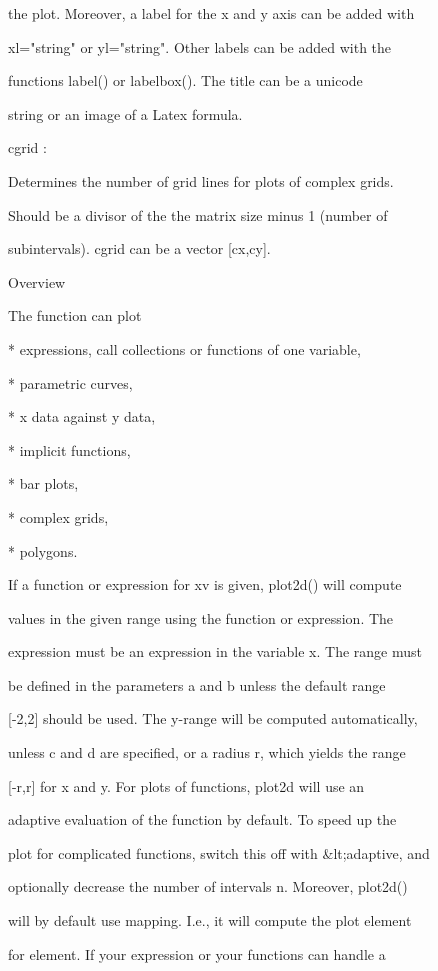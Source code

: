 \documentclass{article}
\begin{document}
  the plot. Moreover, a label for the x and y axis can be added with


  xl="string" or yl="string". Other labels can be added with the


  functions label() or labelbox(). The title can be a unicode


  string or an image of a Latex formula.


cgrid     :


  Determines the number of grid lines for plots of complex grids.


  Should be a divisor of the the matrix size minus 1 (number of


  subintervals). cgrid can be a vector [cx,cy].


Overview


The function can plot


* 
expressions, call collections or functions of one variable,

* 
parametric curves,

* 
x data against y data,

* 
implicit functions,

* 
bar plots,

* 
complex grids,

* 
polygons.


If a function or expression for xv is given, plot2d() will compute


values in the given range using the function or expression. The


expression must be an expression in the variable x. The range must


be defined in the parameters a and b unless the default range


[-2,2] should be used. The y-range will be computed automatically,


unless c and d are specified, or a radius r, which yields the range


[-r,r] for x and y. For plots of functions, plot2d will use an


adaptive evaluation of the function by default. To speed up the


plot for complicated functions, switch this off with &lt;adaptive, and


optionally decrease the number of intervals n. Moreover, plot2d()


will by default use mapping. I.e., it will compute the plot element


for element. If your expression or your functions can handle a
\end{document}
